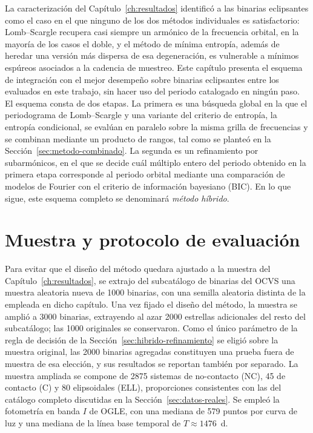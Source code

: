 \documentclass[12pt,letterpaper,oneside]{book}
\begin{document}
La caracterizaci\'on del Cap\'itulo~\ref{ch:resultados} identific\'o a las binarias eclipsantes como el caso en el que ninguno de los dos m\'etodos individuales es satisfactorio: Lomb--Scargle recupera casi siempre un arm\'onico de la frecuencia orbital, en la mayor\'ia de los casos el doble, y el m\'etodo de m\'inima entrop\'ia, adem\'as de heredar una versi\'on m\'as dispersa de esa degeneraci\'on, es vulnerable a m\'inimos esp\'ureos asociados a la cadencia de muestreo. Este cap\'itulo presenta el esquema de integraci\'on con el mejor desempe\~no sobre binarias eclipsantes entre los evaluados en este trabajo, sin hacer uso del periodo catalogado en ning\'un paso. El esquema consta de dos etapas. La primera es una b\'usqueda global en la que el periodograma de Lomb--Scargle y una variante del criterio de entrop\'ia, la entrop\'ia condicional, se eval\'uan en paralelo sobre la misma grilla de frecuencias y se combinan mediante un producto de rangos, tal como se plante\'o en la Secci\'on~\ref{sec:metodo-combinado}. La segunda es un refinamiento por subarm\'onicos, en el que se decide cu\'al m\'ultiplo entero del periodo obtenido en la primera etapa corresponde al periodo orbital mediante una comparaci\'on de modelos de Fourier con el criterio de informaci\'on bayesiano (BIC). En lo que sigue, este esquema completo se denominar\'a \emph{m\'etodo h\'ibrido}.

\section{Muestra y protocolo de evaluaci\'on}
\label{sec:hibrido-muestra}

Para evitar que el dise\~no del m\'etodo quedara ajustado a la muestra del Cap\'itulo~\ref{ch:resultados}, se extrajo del subcat\'alogo de binarias del OCVS \citep{pawlak2016} una muestra aleatoria nueva de 1000 binarias, con una semilla aleatoria distinta de la empleada en dicho cap\'itulo. Una vez fijado el dise\~no del m\'etodo, la muestra se ampli\'o a 3000 binarias, extrayendo al azar 2000 estrellas adicionales del resto del subcat\'alogo; las 1000 originales se conservaron. Como el \'unico par\'ametro de la regla de decisi\'on de la Secci\'on~\ref{sec:hibrido-refinamiento} se eligi\'o sobre la muestra original, las 2000 binarias agregadas constituyen una prueba fuera de muestra de esa elecci\'on, y sus resultados se reportan tambi\'en por separado. La muestra ampliada se compone de 2875 sistemas de no-contacto (NC), 45 de contacto (C) y 80 elipsoidales (ELL), proporciones consistentes con las del cat\'alogo completo discutidas en la Secci\'on~\ref{sec:datos-reales}. Se emple\'o la fotometr\'ia en banda $I$ de OGLE, con una mediana de 579 puntos por curva de luz y una mediana de la l\'inea base temporal de $T\approx1476$~d.
\end{document}
